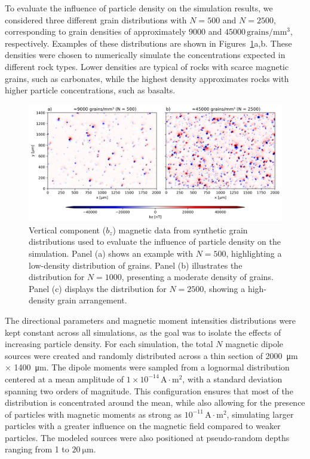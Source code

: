 To evaluate the influence of particle density on the simulation results, we considered three different grain distributions with \(N = 500\) and \(N = 2500\), corresponding to grain densities of approximately \(9000\) and \(45000\,\mathrm{grains/mm^3}\), respectively. Examples of these distributions are shown in Figures~\ref{synthetic-data-maps}a,b. These densities were chosen to numerically simulate the concentrations expected in different rock types. Lower densities are typical of rocks with scarce magnetic grains, such as carbonates, while the highest density approximates rocks with higher particle concentrations, such as basalts.

\begin{figure}[tb!]
  \centering
  \includegraphics[width=1.0\linewidth]{paper/figures/synthetic-different-densities-maps.png}
  \caption{
Vertical component (\(b_z\)) magnetic data from synthetic grain distributions used to evaluate the influence of particle density on the simulation. Panel (a) shows an example with \(N = 500\), highlighting a low-density distribution of grains. Panel (b) illustrates the distribution for \(N = 1000\), presenting a moderate density of grains. Panel (c) displays the distribution for \(N = 2500\), showing a high-density grain arrangement.
  }
  \label{synthetic-data-maps}
\end{figure}


The directional parameters and magnetic moment intensities distributions were kept constant across all simulations, as the goal was to isolate the effects of increasing particle density. For each simulation, the total \(N\) magnetic dipole sources were created and randomly distributed across a thin section of \qty{2000}{\um} \(\times\) \qty{1400}{\um}. The dipole moments were sampled from a lognormal distribution centered at a mean amplitude of \(1 \times 10^{-14}\,\mathrm{A \cdot m^2}\), with a standard deviation spanning two orders of magnitude. This configuration ensures that most of the distribution is concentrated around the mean, while also allowing for the presence of particles with magnetic moments as strong as \(10^{-11}\,\mathrm{A \cdot m^2}\), simulating larger particles with a greater influence on the magnetic field compared to weaker particles. The modeled sources were also positioned at pseudo-random depths ranging from 1 to \(\qty{20}{\micro\meter}\).

